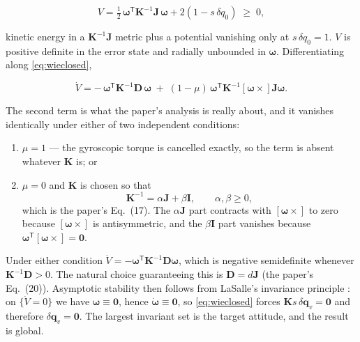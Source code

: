 \documentclass[conference,10pt,a4paper]{IEEEtran}
\newcommand{\vect}[1]{\bm{#1}}
\newcommand{\mat}[1]{\bm{#1}}
\newcommand{\T}{^{\mathsf{T}}}
\newcommand{\skewm}[1]{\left[#1\times\right]}
\begin{document}
\begin{equation}
V = \tfrac{1}{2}\,\vect{\omega}\T\mat{K}^{-1}\mat{J}\,\vect{\omega}
  + 2\left(1-s\,\delta q_0\right) \;\ge\; 0,
\label{eq:V}
\end{equation}

kinetic energy in a $\mat{K}^{-1}\mat{J}$ metric plus a potential vanishing
only at $s\,\delta q_0=1$. $V$ is positive definite in the error state and
radially unbounded in $\vect{\omega}$. Differentiating along
\cref{eq:wieclosed},

\begin{equation}
\dot{V} = -\,\vect{\omega}\T\mat{K}^{-1}\mat{D}\,\vect{\omega}
 \;+\; (1-\mu)\,\vect{\omega}\T\mat{K}^{-1}
   \skewm{\vect{\omega}}\mat{J}\vect{\omega}.
\label{eq:Vdot}
\end{equation}

The second term is what the paper's analysis is really about, and it vanishes
identically under either of two independent conditions:

\begin{enumerate}[label=\textbf{(\alph*)},leftmargin=*,labelsep=0.5em]
\item $\mu=1$ --- the gyroscopic torque is cancelled exactly, so the term is
absent whatever $\mat{K}$ is; or
\item $\mu=0$ and $\mat{K}$ is chosen so that
\begin{equation}
\mat{K}^{-1} = \alpha\mat{J} + \beta\mat{I},
\qquad \alpha,\beta\ge0,
\label{eq:Kcond}
\end{equation}
which is the paper's Eq.~(17). The $\alpha\mat{J}$ part contracts with
$\skewm{\vect{\omega}}$ to zero because $\skewm{\vect{\omega}}$ is
antisymmetric, and the $\beta\mat{I}$ part vanishes because
$\vect{\omega}\T\skewm{\vect{\omega}}=\vect{0}$.
\end{enumerate}

Under either condition $\dot{V}=-\vect{\omega}\T\mat{K}^{-1}\mat{D}\vect{\omega}$,
which is negative semidefinite whenever $\mat{K}^{-1}\mat{D}>0$. The natural
choice guaranteeing this is $\mat{D}=d\mat{J}$ (the paper's Eq.~(20)).
Asymptotic stability then follows from LaSalle's invariance principle
\cite{khalil}: on $\{\dot{V}=0\}$ we have $\vect{\omega}\equiv\vect{0}$, hence
$\dot{\vect{\omega}}\equiv\vect{0}$, so \cref{eq:wieclosed} forces
$\mat{K}s\,\delta\vect{q}_v=\vect{0}$ and therefore
$\delta\vect{q}_v=\vect{0}$. The largest invariant set is the target attitude,
and the result is global.
\end{document}

